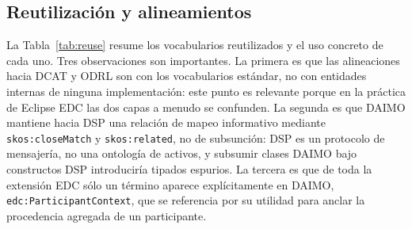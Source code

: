 \documentclass[11pt,a4paper]{article}
\newcommand{\code}[1]{\texttt{#1}}
\begin{document}
\subsection{Reutilización y alineamientos}\label{sec:reuse}

La Tabla~\ref{tab:reuse} resume los vocabularios reutilizados y el uso concreto de cada uno. Tres observaciones son importantes. La primera es que las alineaciones hacia DCAT y ODRL son con los vocabularios estándar, no con entidades internas de ninguna implementación: este punto es relevante porque en la práctica de Eclipse EDC las dos capas a menudo se confunden. La segunda es que DAIMO mantiene hacia DSP una relación de mapeo informativo mediante \code{skos:closeMatch} y \code{skos:related}, no de subsunción: DSP es un protocolo de mensajería, no una ontología de activos, y subsumir clases DAIMO bajo constructos DSP introduciría tipados espurios. La tercera es que de toda la extensión EDC sólo un término aparece explícitamente en DAIMO, \code{edc:ParticipantContext}, que se referencia por su utilidad para anclar la procedencia agregada de un participante.
\end{document}
